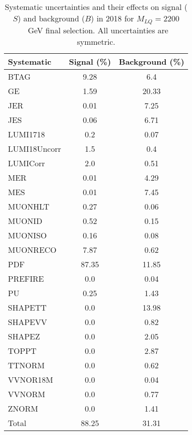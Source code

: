 \begin{table}[htbp]
\begin{center}
\caption{Systematic uncertainties and their effects on signal ($S$) and background ($B$) in 2018 for $M_{LQ}=2200$~GeV final selection. All uncertainties are symmetric.}
\begin{tabular}{lcc}
\hline\hline
Systematic & Signal (\%) & Background (\%) \\ \hline 
BTAG & 9.28 & 6.4\\ 
GE & 1.59 & 20.33\\ 
JER & 0.01 & 7.25\\ 
JES & 0.06 & 6.71\\ 
LUMI1718 & 0.2 & 0.07\\ 
LUMI18Uncorr & 1.5 & 0.4\\ 
LUMICorr & 2.0 & 0.51\\ 
MER & 0.01 & 4.29\\ 
MES & 0.01 & 7.45\\ 
MUONHLT & 0.27 & 0.06\\ 
MUONID & 0.52 & 0.15\\ 
MUONISO & 0.16 & 0.08\\ 
MUONRECO & 7.87 & 0.62\\ 
PDF & 87.35 & 11.85\\ 
PREFIRE & 0.0 & 0.04\\ 
PU & 0.25 & 1.43\\ 
SHAPETT & 0.0 & 13.98\\ 
SHAPEVV & 0.0 & 0.82\\ 
SHAPEZ & 0.0 & 2.05\\ 
TOPPT & 0.0 & 2.87\\ 
TTNORM & 0.0 & 0.62\\ 
VVNOR18M & 0.0 & 0.04\\ 
VVNORM & 0.0 & 0.77\\ 
ZNORM & 0.0 & 1.41\\ 
Total & 88.25 & 31.31\\ \hline \hline
\end{tabular}
\label{tab:SysUncertainties_uujj_2200}
\end{center}
\end{table}

